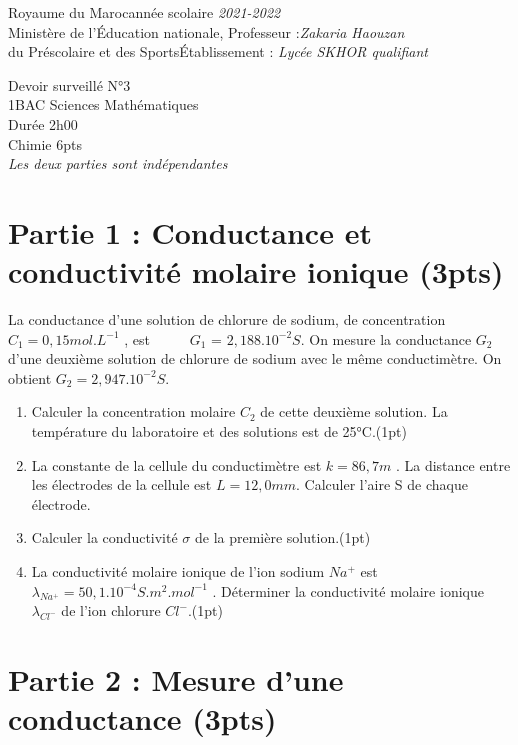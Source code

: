 \documentclass[12pt]{article}
\newcommand\headerMe[2]{\noindent{}#1\hfill#2}
\begin{document}
\headerMe{Royaume du Maroc}{année scolaire \emph{2021-2022}}\\
\headerMe{Ministère de l'Éducation nationale, }{  Professeur :\emph{Zakaria Haouzan}}\\
\headerMe{du Préscolaire et des Sports}{Établissement : \emph{Lycée SKHOR qualifiant}}\\

\begin{center}
Devoir surveillé N°3 \\
    1BAC Sciences Mathématiques\\
Durée 2h00
\\
    \vspace{.2cm}
\hrulefill
\Large{Chimie 6pts}
\hrulefill\\

    \emph{Les deux parties sont indépendantes}
\end{center}

\section*{Partie 1 : Conductance et conductivité molaire ionique \dotfill(3pts) }
    \indent La conductance d’une solution de chlorure de sodium, de concentration $C_1 = 0,15 mol.L^{-1}$ , est$\;\;\;\;\;\;\;\;\;$ $G_1$ = $2,188.10^{-2}S$. On mesure la conductance $G_2$ d’une deuxième solution de chlorure de sodium avec le même conductimètre. On obtient $G_2 = 2,947.10^{-2} S$.

\begin{enumerate}
    \item Calculer la concentration molaire $C_2$ de cette deuxième solution. La température du laboratoire et des solutions est de 25°C.\dotfill(1pt)
    \item La constante de la cellule du conductimètre est $k = 86, 7m$ . La distance entre les électrodes de la cellule est $L = 12,0 mm$. Calculer l’aire S de chaque électrode.
    \item Calculer la conductivité $\sigma$ de la première solution.\dotfill(1pt)
    \item La conductivité molaire ionique de l’ion sodium $Na^+$ est $\lambda_{Na^+} = 50,1.10^{-4} S.m^2.mol^{-1}$ . Déterminer la conductivité molaire ionique $\lambda_{Cl^-}$ de l’ion chlorure $Cl^-$.\dotfill(1pt)
\end{enumerate}

\section*{Partie 2 : Mesure d’une conductance \dotfill(3pts)}
\end{document}
